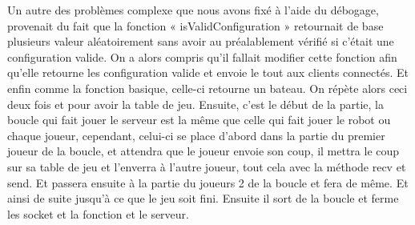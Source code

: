 \documentclass{article}
\begin{document}
	\newline Un autre des problèmes complexe que nous avons fix\'e \`a l'aide du débogage, provenait du fait que la fonction « isValidConfiguration » retournait de base plusieurs valeur aléatoirement sans avoir au préalablement vérifié si c'\'etait une configuration valide. On a alors compris qu’il fallait modifier cette fonction afin qu'elle retourne les configuration valide et envoie le tout aux clients connect\'es.
	\newline Et enfin comme la fonction basique, celle-ci retourne un bateau. On r\'ep\`ete alors ceci deux fois et pour avoir la table de jeu.
	Ensuite, c’est le d\'ebut de la partie, la boucle qui fait jouer le serveur est la même que celle qui fait jouer le robot ou chaque joueur, cependant, celui-ci se place d’abord dans la partie du premier joueur de la boucle, et attendra que le joueur envoie son coup, il mettra le coup sur sa table de jeu et  l’enverra à l’autre joueur, tout cela avec la méthode recv et send. Et passera ensuite à la partie du joueurs 2 de la boucle et fera de même. Et ainsi de suite jusqu’à ce que le jeu soit fini. Ensuite il sort de la boucle et ferme les socket et la fonction et le serveur.
\end{document}
